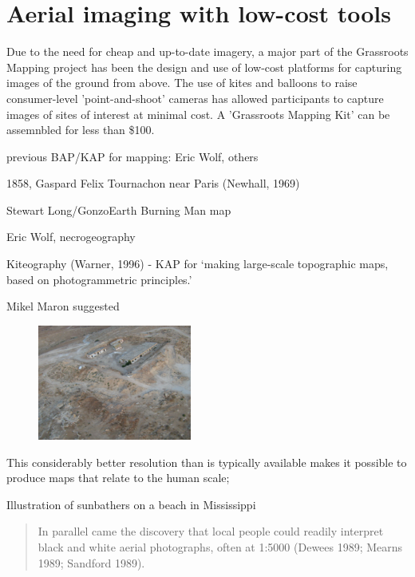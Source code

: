 \documentclass[11pt]{report}
\begin{document}
\section{Aerial imaging with low-cost tools}

Due to the need for cheap and up-to-date imagery, a major part of the Grassroots Mapping project has been the design and use of low-cost platforms for capturing images of the ground from above. The use of kites and balloons to raise consumer-level 'point-and-shoot' cameras has allowed participants to capture images of sites of interest at minimal cost. A 'Grassroots Mapping Kit' can be assemnbled for less than \$100. 

previous BAP/KAP for mapping: Eric Wolf, others

1858, Gaspard Felix Tournachon near Paris (Newhall, 1969) \cite{vierling2006short}

Stewart Long/GonzoEarth Burning Man map

Eric Wolf, necrogeography

Kiteography (Warner, 1996) - KAP for `making large-scale topographic maps, based on photogrammetric principles.' \cite{vierling2006short}

Mikel Maron suggested

\begin{figure}
	\begin{flushright}
		\includegraphics[width=0.45\textwidth]{images/maron-spy-satellite.jpg}
		\cite{maron2008former}
	\end{flushright}
\end{figure}

This considerably better resolution than is typically available makes it possible to produce maps that relate to the human scale; 


Illustration of sunbathers on a beach in Mississippi

\begin{quote}
In parallel came the discovery that local people could readily interpret black and white aerial photographs, often at 1:5000 (Dewees 1989; Mearns 1989; Sandford 1989). 
\cite{chambers2006participatory}
\end{quote}
\end{document}
